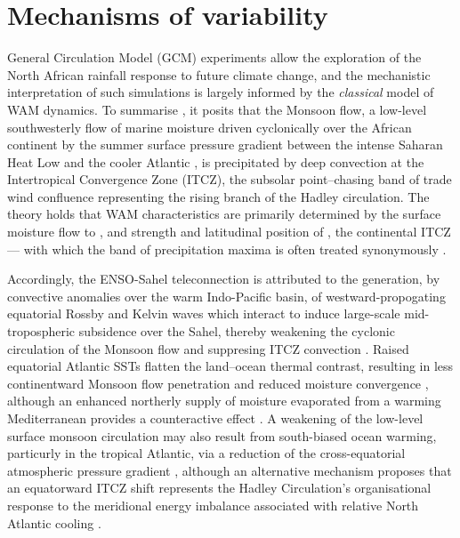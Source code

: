\documentclass[a4paper]{article}
\begin{document}
\section*{Mechanisms of variability}
General Circulation Model (GCM) experiments allow the exploration of the North African rainfall response to future climate change, and the mechanistic interpretation of such simulations is largely informed by the \emph{classical} model of WAM dynamics.
To summarise \parencite[][for more detail]{sultan2000abrupt, sultan2003west2, ramel2006northward}, it posits that the Monsoon flow, a low-level southwesterly flow of marine moisture driven cyclonically over the African continent by the summer surface pressure gradient between the intense Saharan Heat Low and the cooler Atlantic \parencite{hall2006dynamics, grams2010atlantic}, is precipitated by deep convection at the Intertropical Convergence Zone (ITCZ), the subsolar point--chasing band of trade wind confluence representing the rising branch of the Hadley circulation.
The theory holds that WAM characteristics are primarily determined by the surface moisture flow to \parencite{folland1986sahel, sultan2003west1, hagos2007dynamics}, and strength and latitudinal position of \parencite{janicot1998west, damato1998characteristics, sultan2003west1}, the continental ITCZ --- with which the band of precipitation maxima is often treated synonymously \parencite[e.g.][]{shinoda1994tropical, ba1995satellite, ramel2006northward, braconnot2007results, peyrille2016annual}.

Accordingly, the ENSO-Sahel teleconnection is attributed to the generation, by convective anomalies over the warm Indo-Pacific basin, of westward-propogating equatorial Rossby and Kelvin waves which interact to induce large-scale mid-tropospheric subsidence over the Sahel, thereby weakening the cyclonic circulation of the Monsoon flow and suppresing ITCZ convection \parencite{shinoda1994tropical, goddard1999importance, rowell2001teleconnections, janicot2001intra, lu2005oceanic}.
Raised equatorial Atlantic SSTs flatten the land--ocean thermal contrast, resulting in less continentward Monsoon flow penetration and reduced moisture convergence \parencite{vizy2002development, giannini2003oceanic, losada2010multi}, although an enhanced northerly supply of moisture evaporated from a warming Mediterranean provides a counteractive effect \parencite{rowell2003impact, gaetani2010influence}.
A weakening of the low-level surface monsoon circulation may also result from south-biased ocean warming, particurly in the tropical Atlantic, via a reduction of the cross-equatorial atmospheric pressure gradient \parencite{lu2005oceanic, chung2007relationship, biasutti2006robust, zhang2006impact}, although an alternative mechanism proposes that an equatorward ITCZ shift represents the Hadley Circulation's organisational response to the meridional energy imbalance associated with relative North Atlantic cooling \parencite{broccoli2006response, hwang2013anthropogenic}. 
\end{document}
